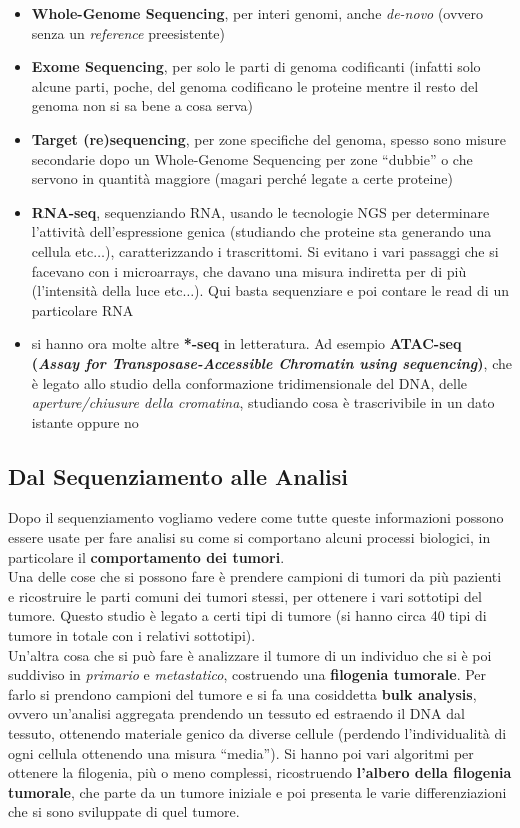 \documentclass[a4paper,12pt, oneside]{book}
\begin{document}
\begin{itemize}
  \item \textbf{Whole-Genome Sequencing}, per interi genomi, anche
  \textit{de-novo} (ovvero senza un \textit{reference} preesistente)
  \item \textbf{Exome Sequencing}, per solo le parti di genoma codificanti
  (infatti solo alcune parti, poche, del genoma codificano le proteine mentre il
  resto del genoma non si sa bene a cosa serva)
  \item \textbf{Target (re)sequencing}, per zone specifiche del genoma, spesso
  sono misure secondarie dopo un Whole-Genome Sequencing per zone ``dubbie'' o
  che servono in quantità maggiore (magari perché legate a certe proteine)
  \item \textbf{RNA-seq}, sequenziando RNA, usando le tecnologie NGS per
  determinare l'attività dell'espressione genica (studiando che proteine sta
  generando una cellula etc$\ldots$), caratterizzando i trascrittomi. Si evitano
  i vari passaggi che si facevano con i microarrays, che davano una misura
  indiretta per di più (l'intensità della luce etc$\ldots$). Qui basta
  sequenziare e poi contare le read di un particolare RNA
  \item si hanno ora molte altre \textbf{*-seq} in letteratura. Ad esempio
  \textbf{ATAC-seq (\textit{Assay for Transposase-Accessible Chromatin using
      sequencing})}, che è legato allo studio della conformazione
  tridimensionale del DNA, delle \textit{aperture/chiusure della cromatina},
  studiando cosa è trascrivibile in un dato istante oppure no
\end{itemize}
\subsection{Dal Sequenziamento alle Analisi}
Dopo il sequenziamento vogliamo vedere come tutte queste informazioni possono
essere usate per fare analisi su come si comportano alcuni processi biologici,
in particolare il \textbf{comportamento dei tumori}.\\
Una delle cose che si possono fare è prendere campioni di tumori da più pazienti
e ricostruire le parti comuni dei tumori stessi, per ottenere i vari sottotipi
del tumore. Questo studio è legato a certi
tipi di tumore (si hanno circa 40 tipi di tumore in totale con i relativi
sottotipi).  \\
Un'altra cosa che si può fare è analizzare il tumore di un individuo che si è
poi suddiviso in \textit{primario} e \textit{metastatico}, costruendo una
\textbf{filogenia tumorale}. Per farlo si prendono campioni del tumore e si fa
una cosiddetta \textbf{bulk analysis}, ovvero un'analisi aggregata prendendo un
tessuto ed estraendo il DNA dal tessuto, ottenendo materiale genico da diverse
cellule (perdendo l'individualità di ogni cellula ottenendo una misura
``media''). Si hanno poi vari algoritmi per ottenere la filogenia, più o meno
complessi, ricostruendo \textbf{l'albero della filogenia tumorale}, che parte da
un tumore iniziale e poi presenta le varie differenziazioni che si sono
sviluppate di quel tumore.
\end{document}
